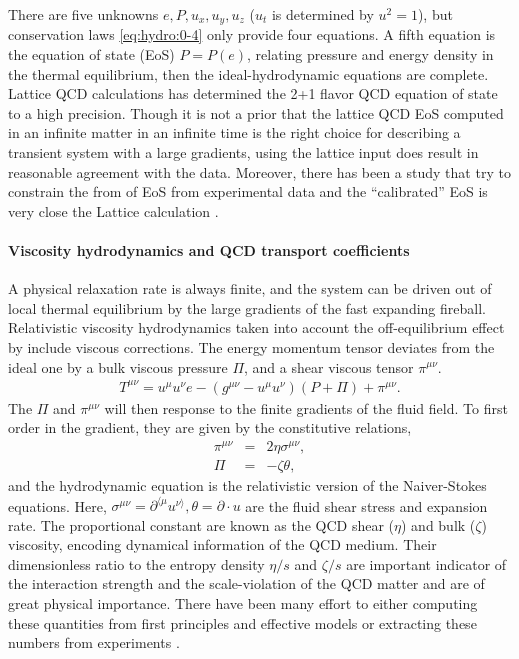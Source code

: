 There are five unknowns $e, P, u_x, u_y, u_z$ ($u_t$ is determined by $u^2 = 1$), but conservation laws \ref{eq:hydro:0-4} only provide four equations.
A fifth equation is the equation of state (EoS) $P = P(e)$, relating pressure and energy density in the thermal equilibrium, then the ideal-hydrodynamic equations are complete.
Lattice QCD calculations has determined the 2+1 flavor QCD equation of state to a high precision.
Though it is not a prior that the lattice QCD EoS computed in an infinite matter in an infinite time is the right choice for describing a transient system with a large gradients, using the lattice input does result in reasonable agreement with the data.
Moreover, there has been a study that try to constrain the from of EoS from experimental data and the ``calibrated'' EoS is very close the Lattice calculation \cite{Pratt:2015zsa}.

\paragraph{Viscosity hydrodynamics and QCD transport coefficients}
A physical relaxation rate is always finite, and the system can be driven out of local thermal equilibrium by the large gradients of the fast expanding fireball.
Relativistic viscosity hydrodynamics taken into account the off-equilibrium effect by include viscous corrections.
The energy momentum tensor deviates from the ideal one by a bulk viscous pressure $\Pi$, and a shear viscous tensor $\pi^{\mu\nu}$.
\begin{eqnarray}
T^{\mu\nu} = u^\mu u^\nu e - (g^{\mu\nu}- u^\mu u^\nu) (P+\Pi) + \pi^{\mu\nu}.
\end{eqnarray}
The $\Pi$ and $\pi^{\mu\nu}$ will then response to the finite gradients of the fluid field.
To first order in the gradient, they are given by the constitutive relations,
\begin{eqnarray}
\pi^{\mu\nu} &=& 2\eta\sigma^{\mu\nu},\\
\Pi &=& -\zeta\theta,
\end{eqnarray}
and the hydrodynamic equation is the relativistic version of the Naiver-Stokes equations.
Here, $\sigma^{\mu\nu} = \partial^{\langle \mu} u^{\nu\rangle}, \theta = \partial\cdot u$ are the fluid shear stress and expansion rate.
The proportional constant are known as the QCD shear ($\eta$) and bulk ($\zeta$) viscosity, encoding dynamical information of the QCD medium. 
Their dimensionless ratio to the entropy density $\eta/s$ and $\zeta/s$ are important indicator of the interaction strength and the scale-violation of the QCD matter and are of great physical importance.
There have been many effort to either computing these quantities from first principles and effective models or extracting these numbers from experiments \cite{Bernhard:2015hxa,Bernhard:2016tnd,Auvinen:2017fjw,Bernhard:2018hnz,Novak:2013bqa}.

